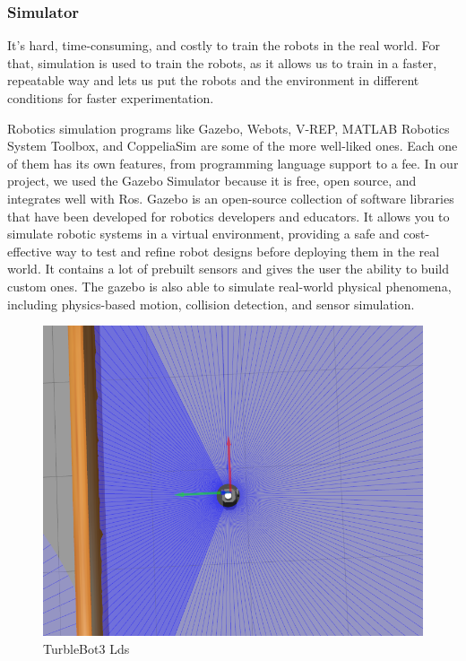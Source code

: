 \documentclass[12pt]{extarticle}
\begin{document}
   



\subsubsection{Simulator}
It's hard, time-consuming, and costly to train the robots in the real world. For that, simulation is used to train the robots, as it allows us to train in a faster, repeatable way and lets us put the robots and the environment in different conditions for faster experimentation.

Robotics simulation programs like Gazebo, Webots, V-REP, MATLAB Robotics System Toolbox, and CoppeliaSim are some of the more well-liked ones. Each one of them has its own features, from programming language support to a fee.
In our project, we used the Gazebo Simulator because it is free, open source, and integrates well with Ros.
Gazebo is an open-source collection of software libraries that have been developed for robotics developers and educators.
It allows you to simulate robotic systems in a virtual environment, providing a safe and cost-effective way to test and refine robot designs before deploying them in the real world. It contains a lot of prebuilt sensors and gives the user the ability to build custom ones. The gazebo is also able to simulate real-world physical phenomena, including physics-based motion, collision detection, and sensor simulation.
  
 \begin{figure}[H]  
\centering
\includegraphics[scale=0.4]{lds.png}
\caption[Lds]{TurbleBot3 Lds}
\label{fig:lds}
\end{figure}
\end{document}
